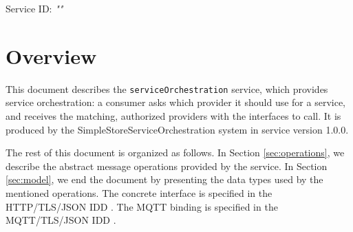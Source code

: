 \documentclass[a4paper]{arrowhead}
\begin{document}
\sloppy

\ArrowheadSetup

\begin{center}
  \vspace*{1cm}
  \huge{\arrowtitle}

  \vspace*{0.2cm}
  \LARGE{\arrowtype}
  \vspace*{1cm}

  \Large{Service ID: \textit{"\arrowid"}}

  \vspace*{\fill}


  \vspace*{1cm}
  \vspace*{\fill}

  \begin{abstract}
    This document describes the \texttt{service\allowbreak{}Orchestration} service, version 1.0.0, produced by the SimpleStoreServiceOrchestration core system of Arrowhead 5.2.2.
  \end{abstract}

  \vspace*{1cm}
\end{center}

\newpage

\tableofcontents
\newpage

\section{Overview}
\label{sec:overview}

This document describes the \texttt{service\allowbreak{}Orchestration} service, which provides service orchestration: a consumer asks which provider it should use for a service, and receives the matching, authorized providers with the interfaces to call.
It is produced by the SimpleStoreServiceOrchestration system \cite{ssso-sysd} in service version 1.0.0.

The rest of this document is organized as follows.
In Section \ref{sec:operations}, we describe the abstract message operations provided by the service.
In Section \ref{sec:model}, we end the document by presenting the data types used by the mentioned operations.
The concrete interface is specified in the HTTP/TLS/JSON IDD \cite{ssso-serviceOrchestration-http-idd}. The MQTT binding is specified in the MQTT/TLS/JSON IDD \cite{ssso-serviceOrchestration-mqtt-idd}.
\end{document}
